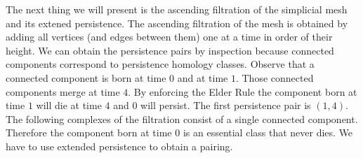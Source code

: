 The next thing we will present is the ascending filtration of the simplicial mesh and its extened persistence. The ascending filtration of the mesh is obtained by adding all vertices (and edges between them) one at a time in order of their height. We can obtain the persistence pairs by inspection because connected components correspond to persistence homology classes. Observe that a connected component is born at time $0$ and at time $1$. Those connected components merge at time $4$. By enforcing the Elder Rule the component born at time $1$ will die at time $4$ and $0$ will persist. The first persistence pair is $(1, 4)$. The following complexes of the filtration consist of a single connected component. Therefore the component born at time $0$ is an essential class that never dies. We have to use extended persistence to obtain a pairing.

